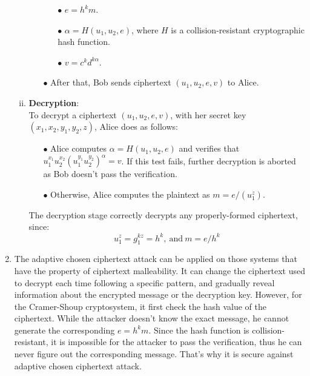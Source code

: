 \documentclass[12pt, a4paper]{article}
\begin{document}
\begin{enumerate}
\begin{enumerate}[(i)]
\begin{itemize}
\begin{itemize}
                            \item[$\bullet$] $e = h^k m$.
                            \item[$\bullet$] $\alpha = H(u_1,u_2,e)$, where $H$ is a collision-resistant cryptographic hash function.
                            \item[$\bullet$] $v = c^k d^{k\alpha}$.
                        \end{itemize}
                        \item[$\bullet$] After that, Bob sends ciphertext $(u_1, u_2, e, v)$ to Alice.
                    \end{itemize}
              \item \textbf{Decryption}:\\
                    To decrypt a ciphertext $(u_1,u_2,e,v)$, with her secret key $(x_1,x_2,y_1,y_2,z)$, Alice does as follows:
                    \begin{itemize}
                        \item[$\bullet$] Alice computes $\alpha = H(u_1,u_2,e)$ and verifies that 
                        $u_1^{x_1}u_2^{x_2}(u_1^{y_1}u_2^{y_2})^\alpha = v$. If this test fails, 
                        further decryption is aborted as Bob doesn't pass the verification.
                        \item[$\bullet$] Otherwise, Alice computes the plaintext as $m = e/(u_1^z)$.
                    \end{itemize}
                    The decryption stage correctly decrypts any properly-formed ciphertext, since: 
                    $$u_1^z = g_1^{kz} = h^k,\ \text{and}\ m = e/h^k$$
          \end{enumerate}
    \item The adaptive chosen ciphertext attack can be applied on those systems that have the property of ciphertext malleability. 
          It can change the ciphertext used to decrypt each time following a specific pattern, 
          and gradually reveal information about the encrypted message or the decryption key. 
          However, for the Cramer-Shoup cryptosystem, it first check the hash value of the ciphertext. 
          While the attacker doesn't know the exact message, he cannot generate the corresponding $e = h^k m$. 
          Since the hash function is collision-resistant, it is impossible for the attacker to pass the verification, 
          thus he can never figure out the corresponding message. 
          That's why it is secure against adaptive chosen ciphertext attack.

\end{enumerate}
\end{document}
